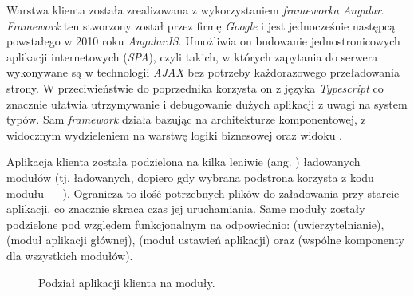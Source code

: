 Warstwa klienta została zrealizowana z wykorzystaniem \textit{frameworka} \textit{Angular}. \textit{Framework} ten
stworzony został przez firmę \textit{Google} i jest jednocześnie następcą powstałego w 2010 roku \textit{AngularJS}.
Umożliwia on budowanie jednostronicowych aplikacji internetowych (\textit{SPA}), czyli takich, w których zapytania do
serwera wykonywane są w technologii \textit{AJAX} bez potrzeby każdorazowego przeładowania strony. W przeciwieństwie do
poprzednika korzysta on z języka \textit{Typescript} co znacznie ułatwia utrzymywanie i debugowanie dużych aplikacji z
uwagi na system typów. Sam \textit{framework} działa bazując na architekturze komponentowej, z widocznym wydzieleniem na
warstwę logiki biznesowej oraz widoku \cite{bib:ts-fain-2019}.

Aplikacja klienta została podzielona na kilka leniwie (ang. ) ładowanych modułów (tj. ładowanych, dopiero
gdy wybrana podstrona korzysta z kodu modułu — ). Ogranicza to ilość potrzebnych plików do
załadowania przy starcie aplikacji, co znacznie skraca czas jej uruchamiania. Same moduły zostały podzielone pod
względem funkcjonalnym na odpowiednio:  (uwierzytelnianie),  (moduł aplikacji głównej),
 (moduł ustawień aplikacji) oraz  (wspólne komponenty dla wszystkich modułów).
%
\begin{figure}[H]
  \centering
  \caption{Podział aplikacji klienta na moduły.}
  \label{fig:client-modules}
\end{figure}


